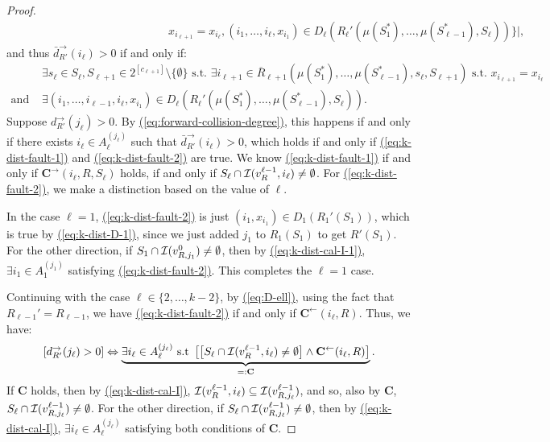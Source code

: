 \documentclass{article}
\newcommand{\eq}[1]{\hyperref[eq:#1]{(\ref*{eq:#1})}}
\renewcommand{\>}{\rangle}
\newcommand{\<}{\langle}
\renewcommand{\(}{\left(}
\renewcommand{\)}{\right)}
\begin{document}
\begin{proof}
\begin{align*}
&\qquad\qquad\qquad\qquad\qquad\qquad\quad\, x_{i_{\ell+1}}=x_{i_{\ell}}, (i_1,\dots,i_{\ell},x_{i_1})\in D_{\ell}(R_{\ell}'(\mu(S_1^*),\dots,\mu(S_{\ell-1}^*),S_{\ell}))\}|,
\end{align*}
and thus $\bar{d}_{R'}^{\rightarrow}(i_{\ell})>0$ if and only if:
\begin{align}
& \exists s_{\ell}\in S_{\ell},S_{\ell+1}\in 2^{[c_{\ell+1}]}\setminus\{\emptyset\}\mbox{ s.t. }\exists i_{\ell+1}\in \overline{R}_{\ell+1}(\mu(S_1^*),\dots,\mu(S_{\ell-1}^*),s_{\ell},S_{\ell+1})\mbox{ s.t. }x_{i_{\ell+1}}=x_{i_{\ell}}\label{eq:k-dist-fault-1}\\
\mbox{and }&\exists (i_1,\dots,i_{\ell-1},i_{\ell},x_{i_1})\in D_{\ell}(R_{\ell}'(\mu(S_1^*),\dots,\mu(S_{\ell-1}^*),S_{\ell})).\label{eq:k-dist-fault-2}
\end{align}
Suppose ${d}_{R'}^{\rightarrow}(j_{\ell})>0$. By \eq{forward-collision-degree}, this happens if and only if there exists $i_{\ell}\in A_{\ell}^{(j_{\ell})}$ such that $\bar{d}_{R'}^{\rightarrow}(i_{\ell})>0$, which holds if and only if \eq{k-dist-fault-1} and \eq{k-dist-fault-2} are true.  We know \eq{k-dist-fault-1} if and only if $\mathbf{C}^{\rightarrow}(i_{\ell},R,S_{\ell})$ holds, if and only if $S_{\ell}\cap {\cal I}(v_R^{\ell-1},i_{\ell})\neq \emptyset$. For \eq{k-dist-fault-2}, we make a distinction based on the value of $\ell$. 

In the case $\ell=1$, \eq{k-dist-fault-2} is just $(i_1,x_{i_1})\in D_1(R_1'(S_1))$, which is true by \eq{k-dist-D-1}, since we just added $j_1$ to $R_1(S_1)$ to get $R'(S_1)$. For the other direction, if $S_{1}\cap {\cal I}(v_{R,j_{1}}^{0})\neq\emptyset$, then by \eq{k-dist-cal-I-1}, $\exists i_{1}\in A_{1}^{(j_{1})}$ satisfying \eq{k-dist-fault-2}. This completes the $\ell=1$ case. 

Continuing with the case $\ell\in\{2,\dots,k-2\}$, by \eq{D-ell}, using the fact that $R_{\ell-1}'=R_{\ell-1}$, we have \eq{k-dist-fault-2} if and only if $\mathbf{C}^{\leftarrow}(i_{\ell},R)$. Thus, we have:
\begin{equation*}
	\left[{d}_{R'}^{\rightarrow}(j_{\ell})>0\right] \Leftrightarrow \underbrace{\exists i_{\ell}\in A_{\ell}^{(j_{\ell})}\mbox{ s.t }\left[\left[ S_{\ell}\cap {\cal I}(v_R^{\ell-1},i_{\ell})\neq \emptyset \right]\wedge \mathbf{C}^{\leftarrow}(i_{\ell},R)\right]}_{=:\mathbf{C}}.\label{eq:k-dist-fault-final}
\end{equation*}
If $\mathbf{C}$ holds, then by \eq{k-dist-cal-I}, ${\cal I}(v_R^{\ell-1},i_{\ell})\subseteq {\cal I}(v_{R,j_{\ell}}^{\ell-1})$, and so, also by $\mathbf{C}$, $S_{\ell}\cap {\cal I}(v_{R,j_{\ell}}^{\ell-1})\neq\emptyset$. For the other direction, if $S_{\ell}\cap {\cal I}(v_{R,j_{\ell}}^{\ell-1})\neq\emptyset$, then by \eq{k-dist-cal-I}, $\exists i_{\ell}\in A_{\ell}^{(j_{\ell})}$ satisfying both conditions of $\mathbf{C}$.
\end{proof}
\end{document}
